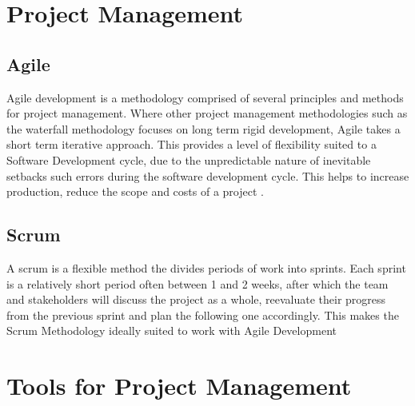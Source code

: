 \section{Project Management}
\subsection{Agile}
Agile development is a methodology comprised of several principles and methods for project management. Where other project management methodologies such as the waterfall methodology focuses on long term rigid development, Agile takes a short term iterative approach. This provides a level of flexibility suited to a Software Development cycle, due to the unpredictable nature of inevitable setbacks such errors during the software development cycle. This helps to increase production, reduce the scope and costs of a project \cite{8078177} .

\subsection{Scrum}
A scrum is a flexible method the divides periods of work into sprints. Each sprint is a relatively short period often between 1 and 2 weeks, after which the team and stakeholders will discuss the project as a whole, reevaluate their progress from the previous sprint and plan the following one accordingly. This makes the Scrum Methodology ideally suited to work with Agile Development \cite{9136647}

\section{Tools for Project Management}

